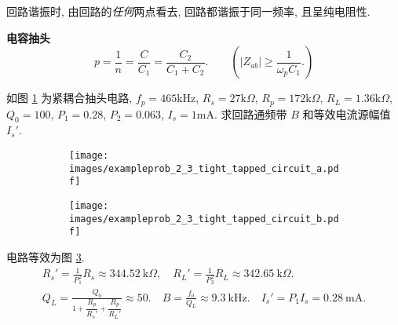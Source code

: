 回路谐振时, 由回路的\textit{任何}两点看去, 回路都谐振于同一频率, 且呈纯电阻性.

\textbf{电容抽头}
\begin{equation}
    p=\frac{1}{n}=\frac{C}{C_1}=\frac{C_2}{C_1+C_2}.\qquad (|Z_{ab}|\geq\frac{1}{\omega_pC_1}.)
\end{equation}

\begin{exampleprob}
    如图 \ref{fig: 2.3 例题 紧耦合抽头电路} 为紧耦合抽头电路, $f_p=465$kHz, $R_s=27\mathrm{k}\Omega$, $R_p=172\mathrm{k}\Omega$, $R_L=1.36\mathrm{k}\Omega$, $Q_0=100$, $P_1=0.28$, $P_2=0.063$, $I_s=1$mA. 求回路通频带 $B$ 和等效电流源幅值 $I_s'$.

    \begin{figure}[H]
        \centering
        \begin{subfigure}{.45\textwidth}
            \centering
            \texttt{[image: images/exampleprob\_2\_3\_tight\_tapped\_circuit\_a.pdf]}
            \caption{}
            \label{fig: 2.3 例题 紧耦合抽头电路}
        \end{subfigure}
        \begin{subfigure}{.45\textwidth}
            \centering
            \texttt{[image: images/exampleprob\_2\_3\_tight\_tapped\_circuit\_b.pdf]}
            \caption{}
            \label{fig: 2.3 例题 紧耦合抽头电路 解}
        \end{subfigure}
    \end{figure}

    \begin{solution}
        电路等效为图 \ref{fig: 2.3 例题 紧耦合抽头电路 解}.
        \begin{gather*}
            R_s'=\frac{1}{P_1^2}R_s\approx 344.52\ \mathrm{k}\Omega,\quad R_L'=\frac{1}{P_2^2}R_L\approx 342.65\ \mathrm{k}\Omega. \\
            Q_L=\frac{Q_0}{1+\dfrac{R_p}{R_s'}+\dfrac{R_p}{R_L'}}\approx 50.\quad B=\frac{f_0}{Q_L}\approx 9.3\ \mathrm{kHz}.\quad I_s'=P_1I_s=0.28\ \mathrm{mA}.
        \end{gather*}
    \end{solution}
\end{exampleprob}
